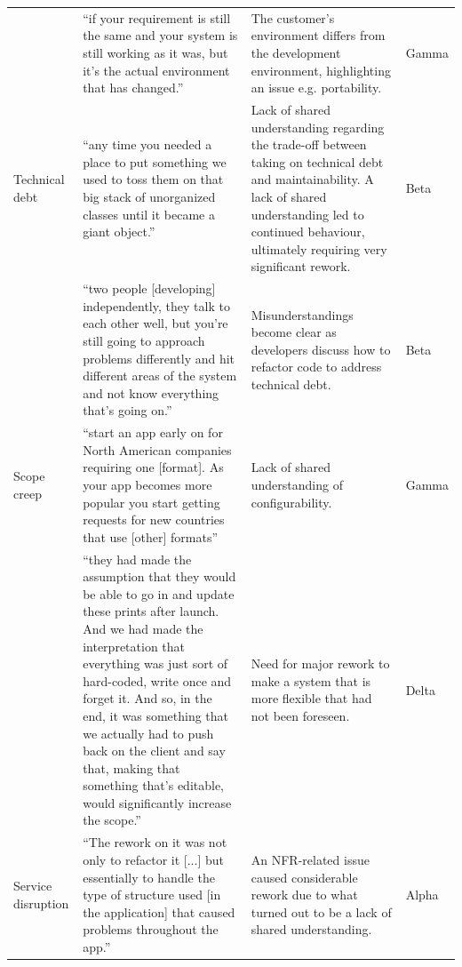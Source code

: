\documentclass[smallextended]{svjour3}        %
\begin{document}
\begin{longtable}{P{1.5cm}p{4.8cm}p{3.3cm}p{1.3cm}}
\addlinespace

& ``if your requirement is still the same and your system is still working as it was, but it's the actual environment that has changed.''
& The customer's environment differs from the development environment, highlighting an issue e.g. portability. 
& Gamma\\

\addlinespace

Technical debt  &
``any time you needed a place to put something we used to toss them on that big stack of
unorganized classes until it became a giant object.''
& Lack of shared understanding regarding the trade-off between taking on technical debt and maintainability. A lack of shared understanding led to continued behaviour, ultimately requiring very significant rework. 
& Beta\\

\addlinespace

& ``two people [developing] independently, they talk to each other well, but you’re still going to approach problems differently and hit different areas of the system and not know everything that’s going on.''
& Misunderstandings become clear as developers discuss how to refactor code to address technical debt.
& Beta \\

\addlinespace

Scope creep 
&
``start an app early on for North American companies requiring one [format]. As your app becomes more popular you start getting requests for new countries that use [other] formats'' 
& Lack of shared understanding of configurability.
&  Gamma\\

\addlinespace

& ``they had made the assumption that they would be able to go in and update these prints after launch. And we had made the interpretation that everything was just sort of hard-coded, write once and forget it. And so, in the end, it was something that we actually had to push back on the client and say that, making that something that’s editable, would significantly increase the scope.''
& Need for major rework to make a system that is more flexible that had not been foreseen.
& Delta\\

\addlinespace
Service disruption &
``The rework on it was not only to refactor it [...] but essentially to handle the type of
structure used [in the application] that caused problems throughout the app.''
& An NFR-related issue caused considerable rework due to what turned out to be a lack of shared understanding.
& Alpha \\



\end{longtable}
\endgroup 
\end{document}
